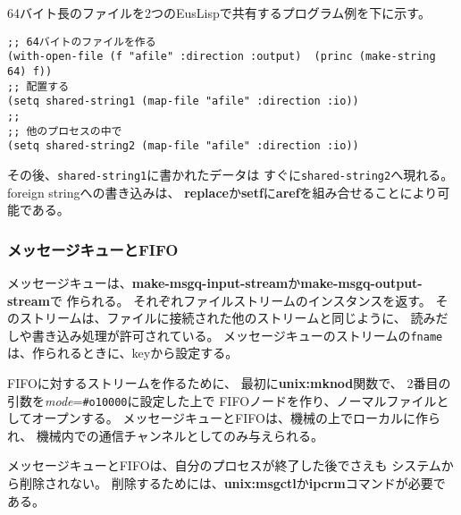 64バイト長のファイルを2つのEusLispで共有するプログラム例を下に示す。

\begin{verbatim}
;; 64バイトのファイルを作る
(with-open-file (f "afile" :direction :output)  (princ (make-string 64) f))
;; 配置する
(setq shared-string1 (map-file "afile" :direction :io))
;;
;; 他のプロセスの中で
(setq shared-string2 (map-file "afile" :direction :io))
\end{verbatim}

その後、{\tt shared-string1}に書かれたデータは
すぐに{\tt shared-string2}へ現れる。
foreign stringへの書き込みは、
{\bf replace}か{\bf setf}に{\bf aref}を組み合せることにより可能である。

\begin{refdesc}
\end{refdesc}

\subsubsection{メッセージキューとFIFO}
メッセージキューは、{\bf make-msgq-input-stream}か{\bf make-msgq-output-stream}で
作られる。
それぞれファイルストリームのインスタンスを返す。
そのストリームは、ファイルに接続された他のストリームと同じように、
読みだしや書き込み処理が許可されている。
メッセージキューのストリームの{\tt fname}は、作られるときに、keyから設定する。

FIFOに対するストリームを作るために、
最初に{\bf unix:mknod}関数で、
2番目の引数を{\em mode}={\tt \#o10000}に設定した上で
FIFOノードを作り、ノーマルファイルとしてオープンする。
メッセージキューとFIFOは、機械の上でローカルに作られ、
機械内での通信チャンネルとしてのみ与えられる。

メッセージキューとFIFOは、自分のプロセスが終了した後でさえも
システムから削除されない。
削除するためには、{\bf unix:msgctl}か{\bf ipcrm}コマンドが必要である。

\begin{refdesc}


\end{refdesc}


